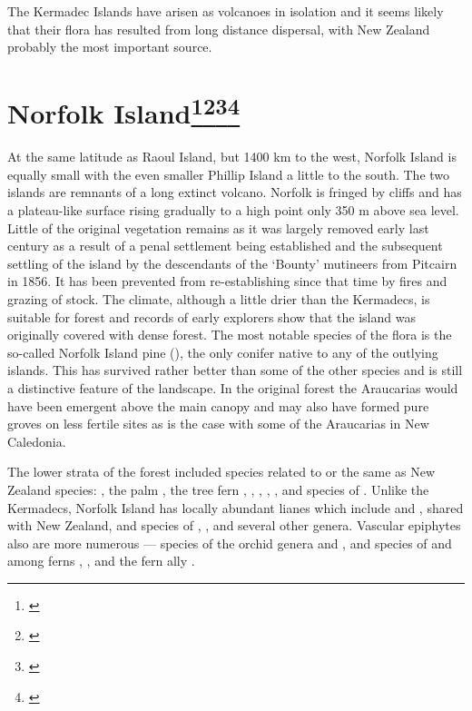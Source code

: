 The Kermadec Islands have arisen as volcanoes in isolation and it seems likely that their flora has resulted from long distance dispersal, with New Zealand probably the most important source.

\section[Norfolk Island]{Norfolk Island\footnote{\cite{laing1915revised}}\footnote{\cite{turner1968conservation}}\footnote{\cite{green1970notes}}\footnote{\cite{green1979observations}}}

At the same latitude as Raoul Island, but 1400 km to the west, Norfolk Island is equally small with the even smaller Phillip Island a little to the south.
The two islands are remnants of a long extinct volcano.
Norfolk is fringed by cliffs and has a plateau-like surface rising gradually to a high point only 350 m above sea level.
Little of the original vegetation remains as it was largely removed early last century as a result of a penal settlement being established and the subsequent settling of the island by the descendants of the `Bounty' mutineers from Pitcairn in 1856.
It has been prevented from re-establishing since that time by fires and grazing of stock.
The climate, although a little drier than the Kermadecs, is suitable for forest and records of early explorers show that the island was originally covered with dense forest.
The most notable species of the flora is the so-called Norfolk Island pine (), the only conifer native to any of the outlying islands.
This has survived rather better than some of the other species and is still a distinctive feature of the landscape.
In the original forest the Araucarias would have been emergent above the main canopy and may also have formed pure groves on less fertile sites as is the case with some of the Araucarias in New Caledonia.

The lower strata of the forest included species related to or the same as New Zealand species: , the palm , the tree fern , , , , ,  and species of .
Unlike the Kermadecs, Norfolk Island has locally abundant lianes which include  and , shared with New Zealand, and species of , ,  and several other genera.
Vascular epiphytes also are more numerous — species of the orchid genera  and , and species of  and among ferns , ,  and the fern ally .

